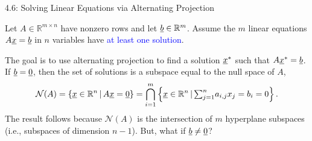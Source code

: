\documentclass[10pt,english,aspectratio=169]{beamer}
\begin{document}
\begin{frame}{4.6: Solving Linear Equations via Alternating Projection}

\vspace{-10mm}

Let $A\in\mathbb{R}^{m\times n}$ have nonzero rows and let $\underline b\in\mathbb{R}^{m}$. Assume the $m$ linear equations $A\underline{x}=\underline{b}$ in $n$ variables have \textcolor{blue}{at least one solution}.

\vspace{3mm}

The goal is to use alternating projection to find a solution $\underline x^{*}$ such that $A\underline x^{*}=\underline b$. If $\underline b=\underline 0$, then the set of solutions is a subspace equal to the null space of $A$,
\[
\mathcal{N}(A)=\left\{ \underline x\in\mathbb{R}^{n}\,|\,A\underline x=\underline 0\right\} =\bigcap_{i=1}^{m}\left\{ \underline x\in\mathbb{R}^{n}\,|\,{\textstyle \sum_{j=1}^{n}}a_{i,j}x_{j}=b_i = 0\right\} .
\]
The result follows because $\mathcal{N}(A)$ is the intersection of $m$ hyperplane subspaces (i.e., subspaces of dimension $n-1$). But, what if $\underline b\neq\underline 0$?


\end{frame}
\end{document}
